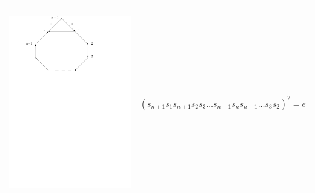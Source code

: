 \documentclass[11pt]{amsart}
\theoremstyle{definition}
\begin{document}
\begin{table}
\begin{tabular}{| p{3.5cm} | p{7cm} |}
\begin{center}\includegraphics[scale = .30]{Diagram4.pdf}\end{center} & $(s_{n+1}s_{1}s_{n+1}s_{2}s_{3} \dots s_{n-1}s_{n}s_{n-1} \dots s_{3}s_{2})^{2} = e$ \\ \hline


\end{tabular}
\end{table}
\end{document}
